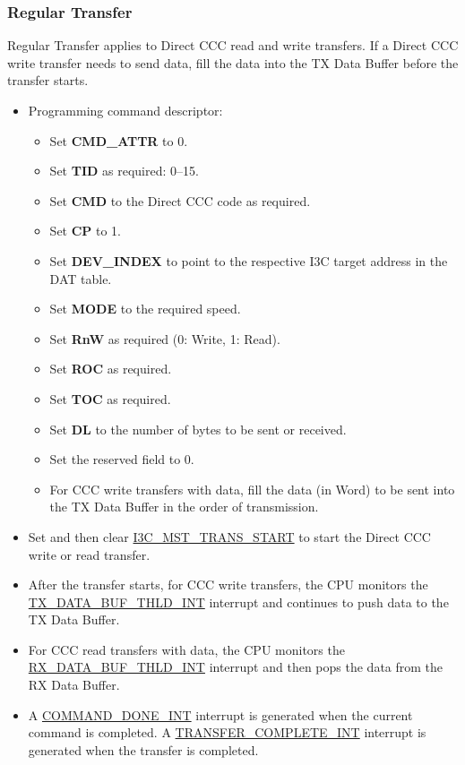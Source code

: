 \documentclass[main\_\_EN.tex]{subfiles}
\begin{document}
\subsubsection{Regular Transfer}
Regular Transfer applies to Direct CCC read and write transfers. If a Direct CCC write transfer needs to send data, fill the data into the TX Data Buffer before the transfer starts.

\begin{itemize}
    \item Programming command descriptor:
    \begin{itemize}
        \item Set \textbf{CMD\_ATTR} to 0.
        \item Set \textbf{TID} as required: 0–15.
        \item Set \textbf{CMD} to the Direct CCC code as required.
        \item Set \textbf{CP} to 1.
        \item Set \textbf{DEV\_INDEX} to point to the respective I3C target address in the DAT table.
        \item Set \textbf{MODE} to the required speed.
        \item Set \textbf{RnW} as required (0: Write, 1: Read).
        \item Set \textbf{ROC} as required.
        \item Set \textbf{TOC} as required.
        \item Set \textbf{DL} to the number of bytes to be sent or received.
        \item Set the reserved field to 0.
        \item For CCC write transfers with data, fill the data (in Word) to be sent into the TX Data Buffer in the order of transmission.
    \end{itemize}
    \item Set and then clear \hyperref[fielddesc:I3CMSTREGTRANSSTART]{I3C\_MST\_TRANS\_START} to start the Direct CCC write or read transfer.
    \item After the transfer starts, for CCC write transfers, the CPU monitors the \hyperref[int:TXDATABUFTHLDINT]{TX\_DATA\_BUF\_THLD\_INT} interrupt and continues to push data to the TX Data Buffer.
    \item For CCC read transfers with data, the CPU monitors the \hyperref[int:RXDATABUFTHLDINT]{RX\_DATA\_BUF\_THLD\_INT} interrupt and then pops the data from the RX Data Buffer.
    \item A \hyperref[int:COMMANDDONEINT]{COMMAND\_DONE\_INT} interrupt is generated when the current command is completed. A \hyperref[int:TRANSFERCOMPLETEINT]{TRANSFER\_COMPLETE\_INT} interrupt is generated when the transfer is completed.

\end{itemize}
\end{document}

